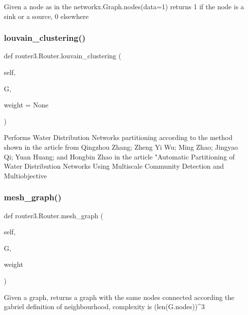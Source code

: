 \begin{DoxyVerb}Given a node as in the networkx.Graph.nodes(data=1)
returns 1 if the node is a sink or a source, 0 elsewhere
\end{DoxyVerb}
 \mbox{\label{classrouter3_1_1_router_a062f81829cd3758466ad982241f8669a}} 
\subsubsection{louvain\+\_\+clustering()}
{\footnotesize\ttfamily def router3.\+Router.\+louvain\+\_\+clustering (\begin{DoxyParamCaption}\item[{}]{self,  }\item[{}]{G,  }\item[{}]{weight = {\ttfamily None} }\end{DoxyParamCaption})}

\begin{DoxyVerb}Performs Water Distribution Networks partitioning according to the method shown in the article from
Qingzhou Zhang; Zheng Yi Wu; Ming Zhao; Jingyao Qi; Yuan Huang; and Hongbin Zhao in the article
"Automatic Partitioning of Water Distribution Networks Using Multiscale Community Detection and Multiobjective
\end{DoxyVerb}
 \mbox{\label{classrouter3_1_1_router_a2ac52ea48745d1681a1e985c9b937721}} 
\subsubsection{mesh\+\_\+graph()}
{\footnotesize\ttfamily def router3.\+Router.\+mesh\+\_\+graph (\begin{DoxyParamCaption}\item[{}]{self,  }\item[{}]{G,  }\item[{}]{weight }\end{DoxyParamCaption})}

\begin{DoxyVerb}Given a graph, returns a graph with the same nodes connected according the gabriel definition of neighbourhood,
complexity is (len(G.nodes))^3
\end{DoxyVerb}
 \mbox{\label{classrouter3_1_1_router_af31bb0b2718b6c7d9fe83a4861a9881f}} 
